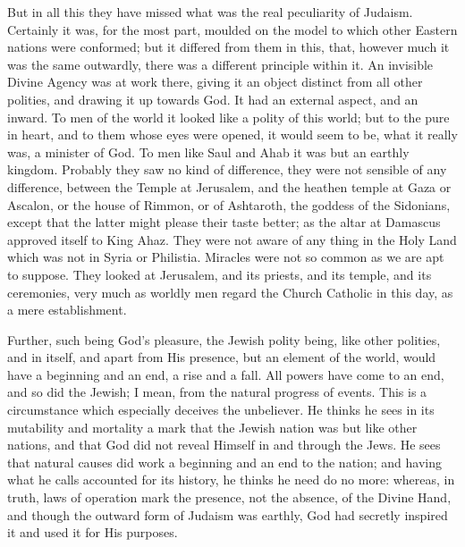But in all this they have missed what was the real peculiarity of
Judaism. Certainly it was, for the most part, moulded on the model to
which other Eastern nations were conformed; but it differed from them
in this, that, however much it was the same outwardly, there was a
different principle within it. An invisible Divine Agency was at work
there, giving it an object distinct from all other polities, and
drawing it up towards God. It had an external aspect, and an inward.
To men of the world it looked like a polity of this world; but to the
pure in heart, and to them whose eyes were opened, it would seem to
be, what it really was, a minister of God. To men like Saul and Ahab
it was but an earthly kingdom. Probably they saw no kind of
difference, they were not sensible of any difference, between the
Temple at Jerusalem, and the heathen temple at Gaza or Ascalon, or the
house of Rimmon, or of Ashtaroth, the goddess of the Sidonians, except
that the latter might please their taste better; as the altar at
Damascus approved itself to King Ahaz. They were not aware of any
thing in the Holy Land which was not in Syria or Philistia. Miracles
were not so common as we are apt to suppose. They looked at Jerusalem,
and its priests, and its temple, and its ceremonies, very much as
worldly men regard the Church Catholic in this day, as a mere
establishment.

Further, such being God's pleasure, the Jewish polity being, like
other polities, and in itself, and apart from His presence, but an
element of the world, would have a beginning and an end, a rise and a
fall. All powers have come to an end, and so did the Jewish; I mean,
from the natural progress of events. This is a circumstance which
especially deceives the unbeliever. He thinks he sees in its
mutability and mortality a mark that the Jewish nation was but like
other nations, and that God did not reveal Himself in and through the
Jews. He sees that natural causes did work a beginning and an end to
the nation; and having what he calls accounted for its history, he
thinks he need do no more: whereas, in truth, laws of operation mark
the presence, not the absence, of the Divine Hand, and though the
outward form of Judaism was earthly, God had secretly inspired it and
used it for His purposes.

